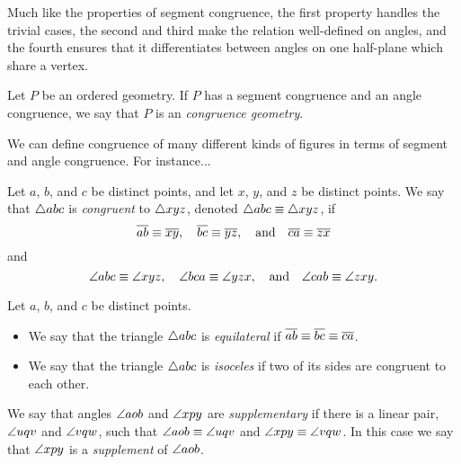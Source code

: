 Much like the properties of segment congruence, the first property handles the trivial cases, the second and third make the relation well-defined on angles, and the fourth ensures that it differentiates between angles on one half-plane which share a vertex.

\begin{dfn}
Let \(P\) be an ordered geometry.
If \(P\) has a segment congruence and an angle congruence, we say that \(P\) is an \emph{congruence geometry}.
\end{dfn}

We can define congruence of many different kinds of figures in terms of segment and angle congruence.
For instance...

\begin{dfn}
Let \(a\), \(b\), and \(c\) be distinct points, and let \(x\), \(y\), and \(z\) be distinct points.
We say that \(\bigtriangleup{abc}\) is \emph{congruent} to \(\bigtriangleup{xyz}\), denoted \(\bigtriangleup{abc} \equiv \bigtriangleup{xyz}\), if \[ \overline{ab} \equiv \overline{xy}, \quad \overline{bc} \equiv \overline{yz}, \quad \mathrm{and} \quad \overline{ca} \equiv \overline{zx} \] and \[ \angle{abc} \equiv \angle{xyz}, \quad \angle{bca} \equiv \angle{yzx}, \quad \mathrm{and} \quad \angle{cab} \equiv \angle{zxy}. \]
\end{dfn}

\begin{dfn}
Let \(a\), \(b\), and \(c\) be distinct points.
\begin{itemize}
\item We say that the triangle \(\bigtriangleup{abc}\) is \emph{equilateral} if \(\overline{ab} \equiv \overline{bc} \equiv \overline{ca}\).
\item We say that the triangle \(\bigtriangleup{abc}\) is \emph{isoceles} if two of its sides are congruent to each other.
\end{itemize}
\end{dfn}


\begin{dfn}
We say that angles \(\angle{aob}\) and \(\angle{xpy}\) are \emph{supplementary} if there is a linear pair, \(\angle{uqv}\) and \(\angle{vqw}\), such that \(\angle{aob} \equiv \angle{uqv}\) and \(\angle{xpy} \equiv \angle{vqw}\).
In this case we say that \(\angle{xpy}\) is a \emph{supplement} of \(\angle{aob}\).
\end{dfn}

